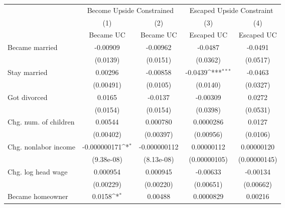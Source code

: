{
\def\sym#1{\ifmmode^{#1}\else\(^{#1}\)\fi}
\begin{tabular}{l*{4}{c}}
\toprule
                    &\multicolumn{2}{c}{Become Upside Constrained}&\multicolumn{2}{c}{Escaped Upside Constraint}\\\cmidrule(lr){2-3}\cmidrule(lr){4-5}
                    &\multicolumn{1}{c}{(1)}&\multicolumn{1}{c}{(2)}&\multicolumn{1}{c}{(3)}&\multicolumn{1}{c}{(4)}\\
                    &\multicolumn{1}{c}{Became UC}&\multicolumn{1}{c}{Became UC}&\multicolumn{1}{c}{Escaped UC}&\multicolumn{1}{c}{Escaped UC}\\
\midrule
Became married      &    -0.00909         &    -0.00962         &     -0.0487         &     -0.0491         \\
                    &    (0.0139)         &    (0.0151)         &    (0.0362)         &    (0.0517)         \\
\addlinespace
Stay married        &     0.00296         &    -0.00858         &     -0.0439\sym{***}&     -0.0463         \\
                    &   (0.00491)         &    (0.0105)         &    (0.0140)         &    (0.0327)         \\
\addlinespace
Got divorced        &      0.0165         &     -0.0137         &    -0.00309         &      0.0272         \\
                    &    (0.0154)         &    (0.0154)         &    (0.0398)         &    (0.0531)         \\
\addlinespace
Chg. num. of children&     0.00544         &    0.000780         &   0.0000286         &      0.0127         \\
                    &   (0.00402)         &   (0.00397)         &   (0.00956)         &    (0.0106)         \\
\addlinespace
Chg. nonlabor income&-0.000000171\sym{*}  &-0.000000112         &  0.00000112         &  0.00000120         \\
                    &  (9.38e-08)         &  (8.13e-08)         &(0.00000105)         &(0.00000145)         \\
\addlinespace
Chg. log head wage  &    0.000954         &    0.000945         &    -0.00633         &    -0.00134         \\
                    &   (0.00229)         &   (0.00220)         &   (0.00651)         &   (0.00662)         \\
\addlinespace
Became homeowner    &      0.0158\sym{*}  &     0.00488         &   0.0000829         &     0.00216         \\

\end{tabular}}
